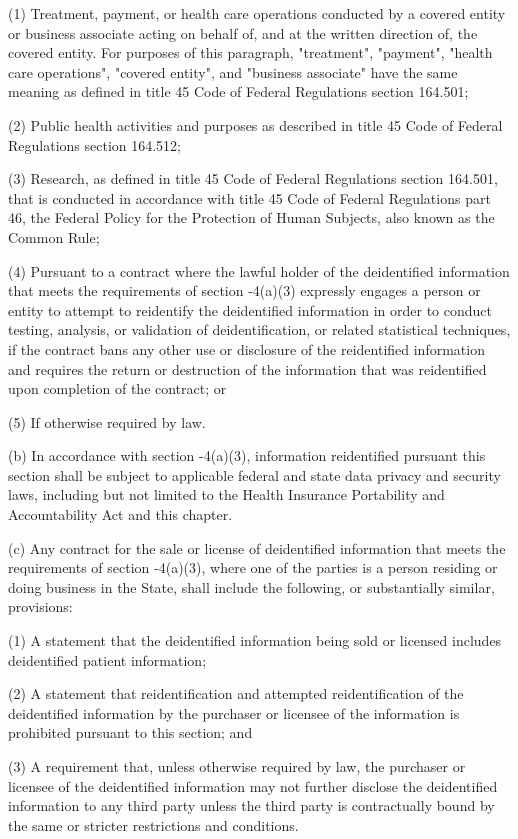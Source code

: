      (1)  Treatment, payment, or health care operations conducted by a covered entity or business associate acting on behalf of, and at the written direction of, the covered entity.  For purposes of this paragraph, "treatment", "payment", "health care operations", "covered entity", and "business associate" have the same meaning as defined in title 45 Code of Federal Regulations section 164.501;

     (2)  Public health activities and purposes as described in title 45 Code of Federal Regulations section 164.512;

     (3)  Research, as defined in title 45 Code of Federal Regulations section 164.501, that is conducted in accordance with title 45 Code of Federal Regulations part 46, the Federal Policy for the Protection of Human Subjects, also known as the Common Rule;

     (4)  Pursuant to a contract where the lawful holder of the deidentified information that meets the requirements of section    -4(a)(3) expressly engages a person or entity to attempt to reidentify the deidentified information in order to conduct testing, analysis, or validation of deidentification, or related statistical techniques, if the contract bans any other use or disclosure of the reidentified information and requires the return or destruction of the information that was reidentified upon completion of the contract; or

     (5)  If otherwise required by law.

     (b)  In accordance with section    -4(a)(3), information reidentified pursuant this section shall be subject to applicable federal and state data privacy and security laws, including but not limited to the Health Insurance Portability and Accountability Act and this chapter.

     (c)  Any contract for the sale or license of deidentified information that meets the requirements of section    ‑4(a)(3), where one of the parties is a person residing or doing business in the State, shall include the following, or substantially similar, provisions:

     (1)  A statement that the deidentified information being sold or licensed includes deidentified patient information;

     (2)  A statement that reidentification and attempted reidentification of the deidentified information by the purchaser or licensee of the information is prohibited pursuant to this section; and

     (3)  A requirement that, unless otherwise required by law, the purchaser or licensee of the deidentified information may not further disclose the deidentified information to any third party unless the third party is contractually bound by the same or stricter restrictions and conditions.

